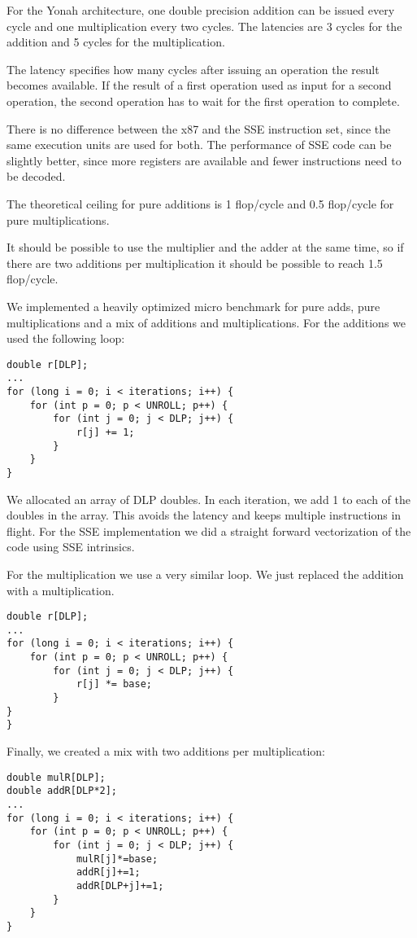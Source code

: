 \documentclass[a4paper,12pt]{article}
\begin{document}
For the Yonah architecture, one double precision addition can be issued every
cycle and one multiplication every two cycles. The latencies are 3 cycles for
the addition and 5 cycles for the multiplication. \cite{inteloptimize} 

The latency specifies how many cycles after issuing an operation the result
becomes available. If the result of a first operation used as input for a second
operation, the second operation has to wait for the first operation to complete.

There is no difference between the x87 and the SSE instruction set, since the
same execution units are used for both. The performance of SSE code can be
slightly better, since more registers are available and fewer instructions need
to be decoded.

The theoretical ceiling for pure additions is 1 flop/cycle and 0.5 flop/cycle
for pure multiplications.

It should be possible to use the multiplier and the adder at the same time, so
if there are two additions per multiplication it should be possible to reach 1.5
flop/cycle.

We implemented a heavily optimized micro benchmark for pure adds, pure
multiplications and a mix of additions and multiplications. For the additions we
used the following loop:

\begin{lstlisting}
double r[DLP];
...
for (long i = 0; i < iterations; i++) {
	for (int p = 0; p < UNROLL; p++) {
		for (int j = 0; j < DLP; j++) {
			r[j] += 1;
		}
	}
}
\end{lstlisting}

We allocated an array of DLP doubles. In each iteration, we add 1 to each of
the doubles in the array. This avoids the latency and keeps multiple
instructions in flight. For the SSE implementation we did a straight
forward vectorization of the code using SSE intrinsics.

For the multiplication we use a very similar loop. We just replaced the
addition with a multiplication. 

\begin{lstlisting}
double r[DLP];
...
for (long i = 0; i < iterations; i++) {
	for (int p = 0; p < UNROLL; p++) {
		for (int j = 0; j < DLP; j++) {
			r[j] *= base;
		}
}
}
\end{lstlisting}

Finally, we created a mix with two additions per multiplication:

\begin{lstlisting}
double mulR[DLP];
double addR[DLP*2];
...
for (long i = 0; i < iterations; i++) {
	for (int p = 0; p < UNROLL; p++) {
		for (int j = 0; j < DLP; j++) {
			mulR[j]*=base;
			addR[j]+=1;
			addR[DLP+j]+=1;
		}
	}
}
\end{lstlisting}
\end{document}
